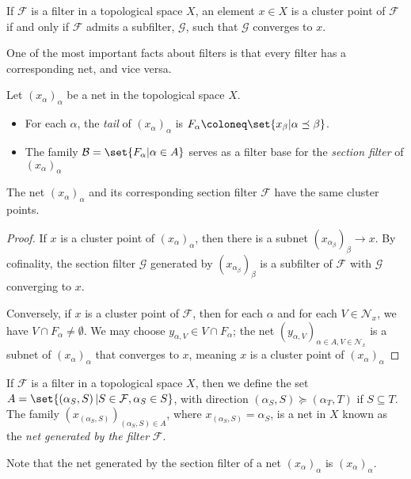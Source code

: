 \documentclass[10pt]{mypackage}
\begin{document}
\begin{theorem}
  If $\mathcal{F}$ is a filter in a topological space $X$, an element $x\in X$ is a cluster point of $\mathcal{F}$ if and only if $\mathcal{F}$ admits a subfilter, $\mathcal{G}$, such that $\mathcal{G}$ converges to $x$.
\end{theorem}
One of the most important facts about filters is that every filter has a corresponding net, and vice versa.
\begin{definition}
  Let $\left( x_{\alpha} \right)_{\alpha}$ be a net in the topological space $X$.
  \begin{itemize}
    \item For each $\alpha$, the \textit{tail} of $\left( x_{\alpha} \right)_{\alpha}$ is $F_{\alpha}\coloneq \set{x_{\beta} | \alpha\preceq \beta}$.
    \item The family $\mathcal{B} = \set{F_{\alpha} | \alpha\in A}$ serves as a filter base for the \textit{section filter} of $\left( x_{\alpha} \right)_{\alpha}$
  \end{itemize}
\end{definition}
\begin{theorem}
  The net $\left( x_{\alpha} \right)_{\alpha}$ and its corresponding section filter $\mathcal{F}$ have the same cluster points.
\end{theorem}
\begin{proof}
  If $x$ is a cluster point of $\left( x_{\alpha} \right)_{\alpha}$, then there is a subnet $\left( x_{\alpha_{\beta}} \right)_{\beta}\rightarrow x$. By cofinality, the section filter $\mathcal{G}$ generated by $\left( x_{\alpha_{\beta}} \right)_{\beta}$ is a subfilter of $\mathcal{F}$ with $\mathcal{G}$ converging to $x$.\newline

  Conversely, if $x$ is a cluster point of $\mathcal{F}$, then for each $\alpha$ and for each $V\in \mathcal{N}_x$, we have $V\cap F_{\alpha}\neq \emptyset$. We may choose $y_{\alpha,V}\in V\cap F_{\alpha}$; the net $\left( y_{\alpha,V} \right)_{\alpha\in A,V\in \mathcal{N}_x}$ is a subnet of $\left( x_{\alpha} \right)_{\alpha}$ that converges to $x$, meaning $x$ is a cluster point of $\left( x_{\alpha} \right)_{\alpha}$
\end{proof}
\begin{definition}
  If $\mathcal{F}$ is a filter in a topological space $X$, then we define the set $A = \set{\left( \alpha_S ,S \right) | S\in \mathcal{F},\alpha_S\in S}$, with direction $\left( \alpha_S,S \right)\succeq \left( \alpha_T,T \right)$ if $S\subseteq T$. The family $\left( x_{\left( \alpha_S,S \right)} \right)_{\left( \alpha_S,S \right)\in A}$, where $x_{\left( \alpha_S,S \right)} = \alpha_S$, is a net in $X$ known as the \textit{net generated by the filter} $\mathcal{F}$.
\end{definition}
  Note that the net generated by the section filter of a net $\left( x_{\alpha} \right)_{\alpha}$ is $\left( x_{\alpha} \right)_{\alpha}$.\newline
\end{document}
